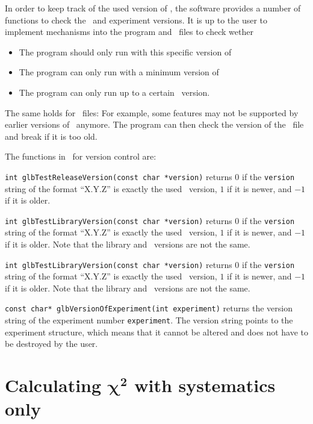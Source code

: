 In order to keep track of the used version of \GLOBES , the software
provides a number of functions to check the \GLOBES\ and experiment
versions. It is up to the user to implement mechanisms into the
program and \AEDL\ files to check wether
\begin{itemize}
\item
 The program should only run with this specific version of \GLOBES
\item
 The program can only run with a minimum version of \GLOBES
\item
 The program can only run up to a certain \GLOBES\ version.
\end{itemize}
The same holds for \AEDL\ files: For example, 
some features may not be supported by earlier versions of \GLOBES\ anymore.
The program can then check the version of the \AEDL\ file and break if it is
too old.

The functions in \GLOBES\ for version control are:
\begin{function}
{\tt int glbTestReleaseVersion(const char *version)} returns $0$ if
the {\tt version} string of the format ``X.Y.Z'' is exactly the
used \GLOBES\ version, $1$ if it is newer, and $-1$ if it is older. 
\end{function}
\begin{function}
{\tt int glbTestLibraryVersion(const char *version)} returns $0$ if
the {\tt version} string of the format ``X.Y.Z'' is exactly the
used \GLOBES\ version, $1$ if it is newer, and $-1$ if it is older.
Note that the library and \GLOBES\ versions are not the same. 
\end{function}
\begin{function}
{\tt int glbTestLibraryVersion(const char *version)} returns $0$ if
the {\tt version} string of the format ``X.Y.Z'' is exactly the
used \GLOBES\ version, $1$ if it is newer, and $-1$ if it is older.
Note that the library and \GLOBES\ versions are not the same. 
\end{function}
\begin{function}
{\tt const char* glbVersionOfExperiment(int experiment)} returns
the version string of the experiment number {\tt experiment}.
The version string points to the experiment structure, which means
that it cannot be altered and does not have to be destroyed by the
user.
\end{function}

\chapter[Calculating $\chi^2$ with systematics only]{Calculating $\boldsymbol{\chi^2}$ with systematics only}

